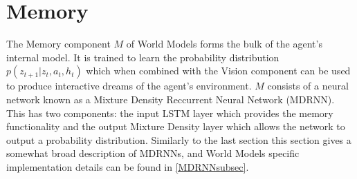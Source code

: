 \documentclass{article}
\numberwithin{figure}{section}
\theoremstyle{definition}
\begin{document}
\section{Memory}
The Memory component $M$ of World Models forms the bulk of the agent's internal model.
It is trained to learn the probability distribution $p(z_{t+1} | z_t, a_t, h_t)$ which when combined with the Vision component can be used to produce interactive dreams of the agent's environment.
$M$ consists of a neural network known as a Mixture Density Reccurrent Neural Network (MDRNN).
This has two components: the input LSTM layer which provides the memory functionality and the output Mixture Density layer which allows the network to output a probability distribution.
Similarly to the last section this section gives a somewhat broad description of MDRNNs, and World Models specific implementation details can be found in \ref{MDRNNsubsec}.
\end{document}
